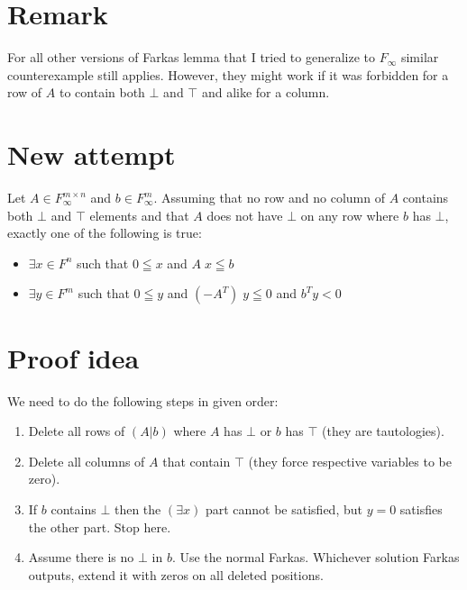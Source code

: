 \documentclass[]{article}
\begin{document}
\section{Remark}

For all other versions of Farkas lemma
that I tried to generalize to $F_\infty$
similar counterexample still applies.
However, they might work if it was forbidden
for a row of $A$ to contain both $\bot$ and $\top$
and alike for a column.


\section{New attempt}

Let $A \in F_\infty^{m \times n}$ and $b \in F_\infty^m$.
Assuming that no row and no column of $A$ contains
both $\bot$ and $\top$ elements and that
$A$ does not have $\bot$ on any row where $b$ has $\bot$,
exactly one of the following is true:
\begin{itemize}
	\item $\exists x \in F^n$ such that
	$0 \leqq x$ and $A\; x \leqq b$
	\item $\exists y \in F^m$ such that
	$0 \leqq y$ and $(-A^T)\; y \leqq 0$ and $b^T y < 0$
\end{itemize}

\section{Proof idea}

We need to do the following steps in given order:
\begin{enumerate}
\item Delete all rows of $(A|b)$ where $A$ has $\bot$ or $b$ has $\top$
(they are tautologies).
\item Delete all columns of $A$ that contain $\top$
(they force respective variables to be zero).
\item If $b$ contains $\bot$ then the $(\exists x)$ part cannot be satisfied,
but $y = 0$ satisfies the other part. Stop here.
\item Assume there is no $\bot$ in $b$. Use the normal Farkas.
Whichever solution Farkas outputs, extend it with zeros on
all deleted positions.
\end{enumerate}
\end{document}
